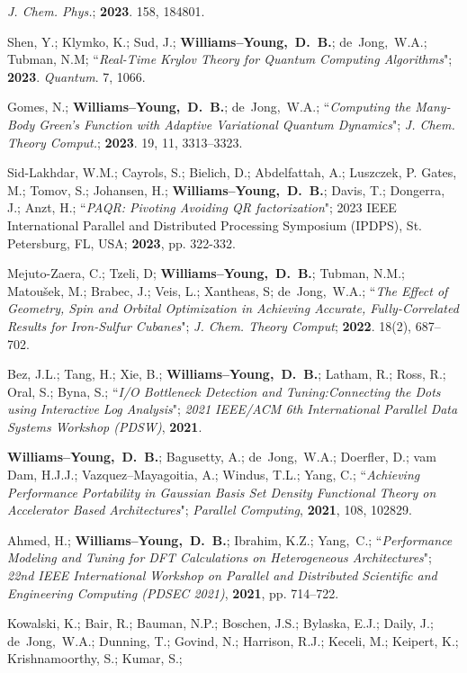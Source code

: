 \documentclass[10pt]{res} %
\newcommand*\me[0]{{\bf Williams--Young,~D.~B.}}
\newcommand*\cy[0]{Yang,~C.}
\newcommand*\bdj[0]{de~Jong,~W.A.}
\begin{document}
\begin{resume}
\begin{etaremune}
        \emph{J. Chem. Phys.}; \textbf{2023}. 158, 184801. 
  \item Shen, Y.; Klymko, K.; Sud, J.; \me; \bdj; Tubman, N.M;
    ``\emph{Real-Time Krylov Theory for Quantum Computing Algorithms}";
    \textbf{2023}. \emph{Quantum}. 7, 1066.
  \item Gomes, N.; \me;  \bdj;
    ``\emph{Computing the Many-Body Green's Function with Adaptive Variational 
            Quantum Dynamics}";
    \emph{J. Chem. Theory Comput.}; \textbf{2023}. 19, 11, 3313–3323.
  \item Sid-Lakhdar, W.M.; Cayrols, S.; Bielich, D.; Abdelfattah, A.; Luszczek, P.  Gates, M.; Tomov, S.; 
        Johansen, H.; \me; Davis, T.; Dongerra, J.; Anzt, H.; 
        ``\emph{PAQR: Pivoting Avoiding QR factorization}"; 
        2023 IEEE International Parallel and Distributed Processing Symposium (IPDPS), St. Petersburg, FL, USA; \textbf{2023}, pp. 322-332.
  \item Mejuto-Zaera, C.; Tzeli, D; \me; Tubman, N.M.; Matoušek, M.; Brabec, J.; Veis, L.; Xantheas, S; \bdj; 
       ``\emph{The Effect of Geometry, Spin and Orbital Optimization in Achieving Accurate, Fully-Correlated Results for Iron-Sulfur 
                Cubanes}"; \emph{J. Chem. Theory Comput}; \textbf{2022}. 18(2), 687–702.
  \item Bez, J.L.; Tang, H.; Xie, B.; \me; Latham, R.; Ross, R.; Oral, S.; Byna, S.;
        ``\emph{I/O Bottleneck Detection and Tuning:Connecting the Dots using Interactive Log Analysis}";
        \emph{2021 IEEE/ACM 6th International Parallel Data Systems Workshop (PDSW)}, 
        \textbf{2021}.
  \item \me; Bagusetty, A.; \bdj; Doerfler, D.; vam Dam, H.J.J.; Vazquez--Mayagoitia, A.;
        Windus, T.L.; Yang, C.;
        ``\emph{Achieving Performance Portability in Gaussian Basis Set Density Functional Theory 
                on Accelerator Based Architectures}"; \emph{Parallel Computing},
        \textbf{2021}, 108, 102829.
  \item Ahmed, H.; \me; Ibrahim, K.Z.; \cy;
        ``\emph{Performance Modeling and Tuning for DFT Calculations on Heterogeneous Architectures}";
        \emph{22nd IEEE International Workshop on Parallel and Distributed Scientific and Engineering Computing (PDSEC 2021)},
        \textbf{2021}, pp. 714--722.
  \item Kowalski, K.; Bair, R.; Bauman, N.P.; Boschen, J.S.; Bylaska, E.J.; Daily, J.; \bdj; 
        Dunning, T.; Govind, N.; Harrison, R.J.; Keceli, M.; Keipert, K.; Krishnamoorthy, S.; Kumar, S.;

\end{etaremune}
\end{resume}
\end{document}
